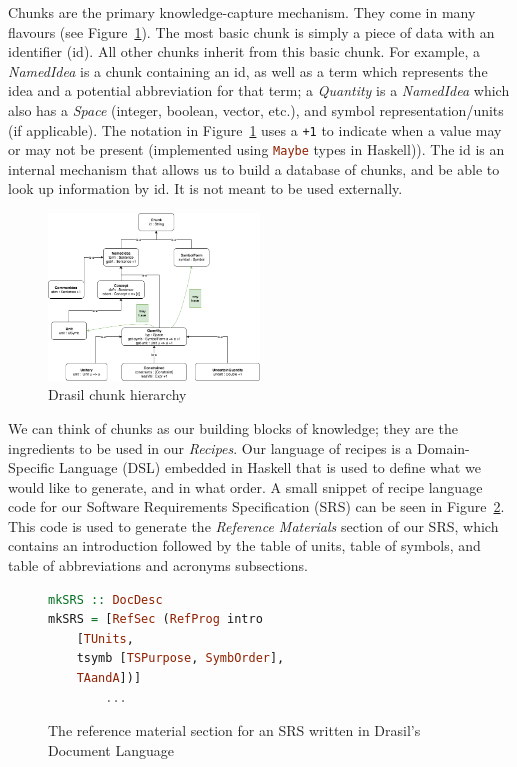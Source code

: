 \documentclass[sigconf]{acmart}
\newcommand{\inlHask}[1]{\lstinline[language=Haskell, columns=fullflexible,
  basicstyle=\ttfamily, showstringspaces=false, breaklines=true]{#1}}
\begin{document}
Chunks are the primary knowledge-capture mechanism. They come in many flavours
(see Figure~\ref{hierarchy}). The most basic chunk is simply a 
piece of data with an identifier (id). All other chunks inherit from this
basic chunk.  For example, a \textit{NamedIdea} is a chunk containing an id, 
as well as a term which represents the idea and a potential abbreviation for 
that term; a \textit{Quantity} is a \textit{NamedIdea}
which also has a \textit{Space} (integer, boolean, vector, etc.), 
and symbol representation/units (if applicable).  The notation in
Figure~\ref{hierarchy} uses a \verb|+1| to indicate when a value may or
may not be present (implemented using 
\inlHask{Maybe} types in Haskell)).  The id is an internal
mechanism that allows us to build a database of chunks, and be able to
look up information by id. It is not meant to be used externally.

\begin{figure}
    \centering
    \includegraphics[width=0.5\textwidth]{figures/class_hierarchy.png}
    \caption{Drasil chunk hierarchy}
    \label{hierarchy}
\end{figure}

We can think of chunks as our building blocks of knowledge; they are the 
ingredients to be used in our \textit{Recipes}. Our language of recipes is a 
Domain-Specific Language (DSL) embedded in Haskell that is used to define what 
we would like to generate, and in what order. A small snippet of recipe 
language code for our Software Requirements Specification (SRS) can be seen in 
Figure~\ref{recipeLang}. This code is used to generate the \textit{Reference 
Materials} section of our SRS, which contains an introduction followed by the 
table of units, table of symbols, and table of abbreviations and acronyms 
subsections.

\begin{figure}
\begin{lstlisting}[language=Haskell, frame=single, showstringspaces=false]
mkSRS :: DocDesc 
mkSRS = [RefSec (RefProg intro 
    [TUnits, 
    tsymb [TSPurpose, SymbOrder], 
    TAandA])]
        ...
\end{lstlisting}
\caption{The reference material section for an SRS written in Drasil's Document 
Language}
\label{recipeLang}
\end{figure}
\end{document}
